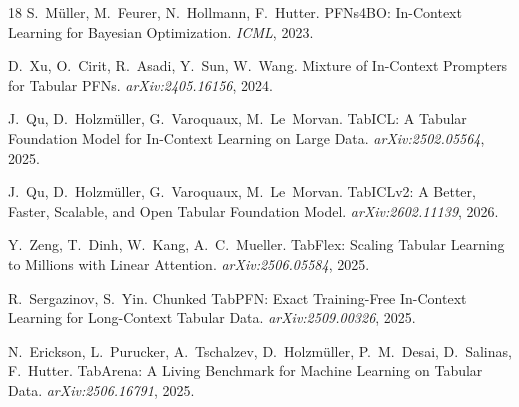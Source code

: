 \documentclass[11pt]{article}
\begin{document}
\begin{thebibliography}{18}
S.~M\"uller, M.~Feurer, N.~Hollmann, F.~Hutter.
\newblock PFNs4BO: In-Context Learning for Bayesian Optimization.
\newblock \emph{ICML}, 2023.

D.~Xu, O.~Cirit, R.~Asadi, Y.~Sun, W.~Wang.
\newblock Mixture of In-Context Prompters for Tabular PFNs.
\newblock \emph{arXiv:2405.16156}, 2024.

J.~Qu, D.~Holzm\"uller, G.~Varoquaux, M.~Le~Morvan.
\newblock TabICL: A Tabular Foundation Model for In-Context Learning on
Large Data.
\newblock \emph{arXiv:2502.05564}, 2025.

J.~Qu, D.~Holzm\"uller, G.~Varoquaux, M.~Le~Morvan.
\newblock TabICLv2: A Better, Faster, Scalable, and Open Tabular Foundation
Model.
\newblock \emph{arXiv:2602.11139}, 2026.

Y.~Zeng, T.~Dinh, W.~Kang, A.~C.~Mueller.
\newblock TabFlex: Scaling Tabular Learning to Millions with Linear
Attention.
\newblock \emph{arXiv:2506.05584}, 2025.

R.~Sergazinov, S.~Yin.
\newblock Chunked TabPFN: Exact Training-Free In-Context Learning for
Long-Context Tabular Data.
\newblock \emph{arXiv:2509.00326}, 2025.

N.~Erickson, L.~Purucker, A.~Tschalzev, D.~Holzm\"uller, P.~M.~Desai,
D.~Salinas, F.~Hutter.
\newblock TabArena: A Living Benchmark for Machine Learning on Tabular Data.
\newblock \emph{arXiv:2506.16791}, 2025.

\end{thebibliography}
\end{document}
